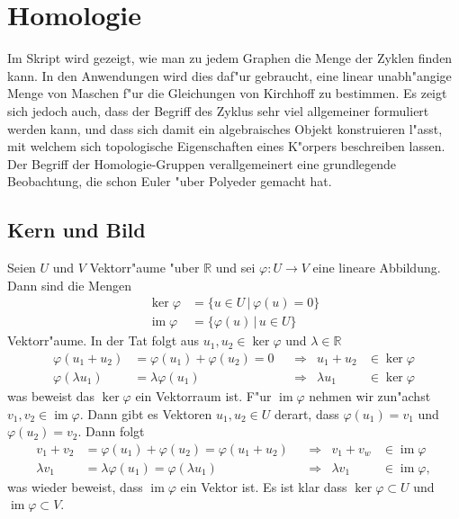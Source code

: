 %
%
%
\chapter{Homologie}
Im Skript wird gezeigt, wie man zu jedem Graphen die Menge der Zyklen
finden kann.
In den Anwendungen wird dies daf"ur gebraucht, eine linear unabh"angige
Menge von Maschen f"ur die Gleichungen von Kirchhoff zu bestimmen.
Es zeigt sich jedoch auch, dass der Begriff des Zyklus sehr viel
allgemeiner formuliert werden kann, und dass sich damit ein algebraisches
Objekt konstruieren l"asst, mit welchem sich topologische Eigenschaften
eines K"orpers beschreiben lassen.
Der Begriff der Homologie-Gruppen verallgemeinert eine grundlegende
Beobachtung, die schon Euler "uber Polyeder gemacht hat.

\section{Kern und Bild}
Seien $U$ und $V$ Vektorr"aume "uber $\mathbb R$ und sei $\varphi\colon U\to V$
eine lineare Abbildung.
Dann sind die Mengen
\begin{align*}
\operatorname{ker}\varphi&=\{u\in U\,|\, \varphi(u) = 0\}
\\
\operatorname{im}\varphi&=\{\varphi(u)\,|\, u\in U\}
\end{align*}
Vektorr"aume.
In der Tat folgt aus $u_1,u_2\in\operatorname{ker}\varphi$
und $\lambda\in\mathbb R$
\begin{align*}
\varphi(u_1+u_2)&=\varphi(u_1)+\varphi(u_2) = 0
&
&\Rightarrow&
u_1+u_2&\in\operatorname{ker}\varphi
\\
\varphi(\lambda u_1)&=\lambda\varphi(u_1)
&
&\Rightarrow&
\lambda u_1&\in\operatorname{ker}\varphi
\end{align*}
was beweist das $\operatorname{ker}\varphi$ ein Vektorraum ist.
F"ur $\operatorname{im}\varphi$ nehmen wir zun"achst
$v_1,v_2\in\operatorname{im}\varphi$.
Dann gibt es Vektoren $u_1,u_2\in U$ derart, dass
$\varphi(u_1)=v_1$ und $\varphi(u_2)=v_2$.
Dann folgt
\begin{align*}
v_1+v_2&=\varphi(u_1)+\varphi(u_2)=\varphi(u_1+u_2)
&
&\Rightarrow&
v_1+v_w&\in\operatorname{im}\varphi
\\
\lambda v_1&=\lambda\varphi(u_1)=\varphi(\lambda u_1)
&
&\Rightarrow&
\lambda v_1&\in\operatorname{im}\varphi,
\end{align*}
was wieder beweist, dass $\operatorname{im}\varphi$ ein Vektor ist.
Es ist klar dass $\operatorname{ker}\varphi\subset U$ und
$\operatorname{im}\varphi\subset V$.

